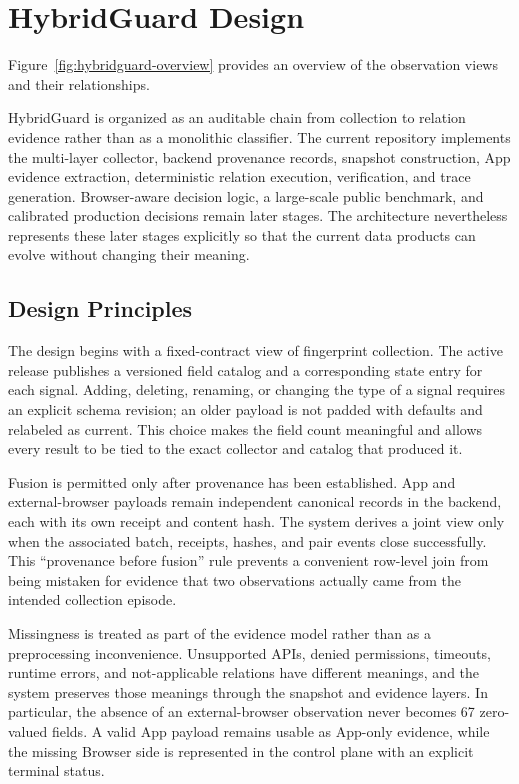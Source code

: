 \section{HybridGuard Design}
\label{sec:system}



Figure~\ref{fig:hybridguard-overview} provides an overview of the observation views and their relationships.

HybridGuard is organized as an auditable chain from collection to relation evidence rather than as a monolithic classifier. The current repository implements the multi-layer collector, backend provenance records, snapshot construction, App evidence extraction, deterministic relation execution, verification, and trace generation. Browser-aware decision logic, a large-scale public benchmark, and calibrated production decisions remain later stages. The architecture nevertheless represents these later stages explicitly so that the current data products can evolve without changing their meaning.

\subsection{Design Principles}

The design begins with a fixed-contract view of fingerprint collection. The active release publishes a versioned field catalog and a corresponding state entry for each signal. Adding, deleting, renaming, or changing the type of a signal requires an explicit schema revision; an older payload is not padded with defaults and relabeled as current. This choice makes the field count meaningful and allows every result to be tied to the exact collector and catalog that produced it.

Fusion is permitted only after provenance has been established. App and external-browser payloads remain independent canonical records in the backend, each with its own receipt and content hash. The system derives a joint view only when the associated batch, receipts, hashes, and pair events close successfully. This ``provenance before fusion'' rule prevents a convenient row-level join from being mistaken for evidence that two observations actually came from the intended collection episode.

Missingness is treated as part of the evidence model rather than as a preprocessing inconvenience. Unsupported APIs, denied permissions, timeouts, runtime errors, and not-applicable relations have different meanings, and the system preserves those meanings through the snapshot and evidence layers. In particular, the absence of an external-browser observation never becomes 67 zero-valued fields. A valid App payload remains usable as App-only evidence, while the missing Browser side is represented in the control plane with an explicit terminal status.

